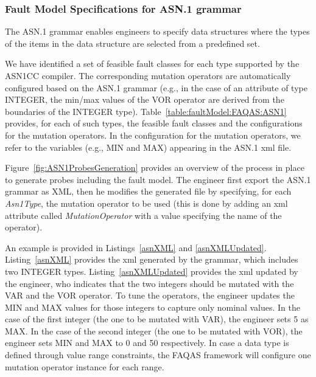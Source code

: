 \ENDCHANGEDWPT

\clearpage

\subsubsection{Fault Model Specifications for ASN.1 grammar}
\label{subsub:asn1model}

The ASN.1 grammar enables engineers to specify data structures where the types of the items in the data structure are selected from a predefined set.


We have identified a set of feasible fault classes for each type supported by the ASN1CC compiler.
The corresponding mutation operators are automatically configured based on the ASN.1 grammar (e.g., in the case of an attribute of type INTEGER, the min/max values of the VOR operator are derived from the boundaries of the INTEGER type).
Table~\ref{table:faultModel:FAQAS:ASN1} provides, for each of such types, the feasible fault classes and the configurations for the mutation operators.
In the configuration for the mutation operators, we refer to the variables (e.g., MIN and MAX) appearing in the ASN.1 xml file.

Figure~\ref{fig:ASN1ProbesGeneration} provides an overview of the process in place to generate probes including the fault model.
The engineer first export the ASN.1 grammar as XML, then he modifies the generated file by specifying, for each \emph{Asn1Type}, the mutation operator to be used (this is done by adding an xml attribute called \emph{MutationOperator} with a value specifying the name of the operator). 

An example is provided in Listings~\ref{asnXML} and \ref{asnXMLUpdated}. Listing~\ref{asnXML} provides the xml generated by the grammar, which includes two INTEGER types.
Listing~\ref{asnXMLUpdated} provides the xml updated by the engineer, who indicates that the two integers should be mutated with the VAR and the VOR operator. To tune the operators, the engineer updates the MIN and MAX values for those integers to capture only nominal values. 
In the case of the first integer (the one to be mutated with VAR), the engineer sets 5 as MAX.
In the case of the second integer (the one to be mutated with VOR), the engineer sets MIN and MAX to 0 and 50 respectively.
In case a data type is defined through value range constraints, the FAQAS framework will configure one mutation operator instance for each range.

